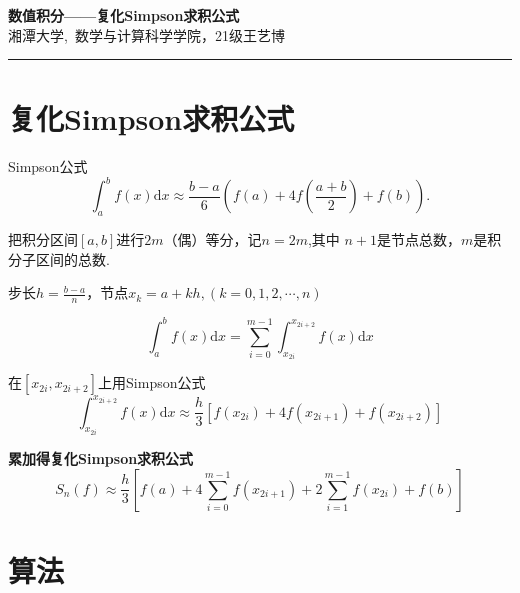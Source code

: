 \documentclass{xtupaper}
\begin{document}
\begin{center}
\LARGE
  \textbf{数值积分——复化Simpson求积公式}\\
  \vspace{0.5em}
  \large
湘潭大学,\ 数学与计算科学学院，21级王艺博
  \end{center}
\rule[0.1\baselineskip]{\textwidth}{0.5pt}

\section{复化Simpson求积公式}

Simpson公式
\[\int_a^bf(x)\mathrm{d}x\approx\frac{b-a}{6}\left(f(a)+4f\left(\frac{a+b}{2}\right)+f(b)\right).\]
 
把积分区间$[a,b]$进行$2m$（偶）等分，记$n = 2m$,其中 $n+1$是节点总数，$m$是积分子区间的总数.

步长$h=\frac{b-a}{n}$，节点$x_{k}=a+kh,(k=0,1,2,\cdots,n)$

\[\int_{a}^{b}f(x)\mathrm{d}x=\sum_{i=0}^{m-1}\int_{x_{2i}}^{x_{2i+2}}f(x)\mathrm{d}x\]

	
	在$ [x_{2i},x_{2i+2}] $上用Simpson公式
	\[\int_{x_{2i}}^{x_{2i+2}}f(x)\mathrm{d}x \approx \frac{h}{3}[f(x_{2i})+4f(x_{2i+1})+f(x_{2i+2})] \]

\textbf{累加得复化Simpson求积公式}
	\[S_n(f) \approx\frac{h}{3}\left[f(a)+4\sum_{i=0}^{m-1}f(x_{2i+1})+2\sum_{i=1}^{m-1}f(x_{2i})+f(b)\right]\]
\newpage
\section{算法}
\end{document}
